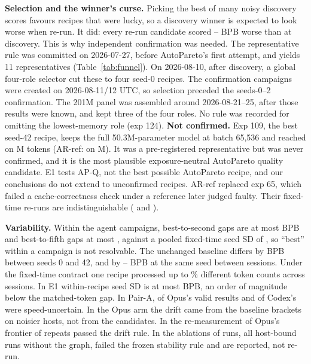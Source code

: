 \documentclass{article}
\newif\ifshowhumanmarkers \showhumanmarkersfalse
\newcommand{\humantag}[1]{{\color{humanframe}\sffamily\scriptsize\bfseries HUMAN AUTHOR MUST REWRITE/VERIFY [#1]}\ }
\newcommand{\humanauthor}[2][]{\ifshowhumanmarkers\begin{humanbox}\humantag{#1}#2\end{humanbox}\else #2\par\fi}
\begin{document}
\humanauthor[P2-09]{\textbf{Selection and the winner's curse.} Picking the best of many noisy discovery scores favours recipes that were lucky, so a discovery winner is expected to look worse when re-run. It did: every re-run candidate scored \CROptMin--\CROptMax{} BPB worse than at discovery. This is why independent confirmation was needed. The representative rule was committed on 2026-07-27, before AutoPareto's first attempt, and yields 11 representatives (Table~\ref{tab:funnel}). On 2026-08-10, after discovery, a global four-role selector cut these to four seed-0 recipes. The confirmation campaigns were created on 2026-08-11/12 UTC, so selection preceded the seeds-0--2 confirmation. The 201M panel was assembled around 2026-08-21--25, after those results were known, and kept three of the four roles. No rule was recorded for omitting the lowest-memory role (exp 124). \textbf{Not confirmed.} Exp 109, the best seed-42 recipe, keeps the full 50.3M-parameter model at batch 65,536 and reached \CRExpOneZeroNineBPB{} on \CRExpOneZeroNineTokens M tokens (AR-ref: \CRSeedFortyTwoAR{} on \CRExpSixEightTokens M). It was a pre-registered representative but was never confirmed, and it is the most plausible exposure-neutral AutoPareto quality candidate. E1 tests AP-Q, not the best possible AutoPareto recipe, and our conclusions do not extend to unconfirmed recipes. AR-ref replaced exp 65, which failed a cache-correctness check under a reference later judged faulty. Their fixed-time re-runs are indistinguishable (\CRFixedSixtyFive{} and \CRFixedSixtyEight).}

\humanauthor[P2-10]{\textbf{Variability.} Within the agent campaigns, best-to-second gaps are at most \CRGapTwoMax{} BPB and best-to-fifth gaps at most \CRGapFiveMax, against a pooled fixed-time seed SD of \CRPooledSD, so ``best'' within a campaign is not resolvable. The unchanged baseline differs by \CRBaseSeedEffect{} BPB between seeds 0 and 42, and by \CRSessionLo--\CRSessionHi{} BPB at the same seed between sessions. Under the fixed-time contract one recipe processed up to \CRTokenSpreadMax\% different token counts across sessions. In E1 within-recipe seed SD is at most \CREOneMaxSD{} BPB, an order of magnitude below the matched-token gap. In Pair-A, \CROpUncertain{} of Opus's \CROpValid{} valid results and \CRCxUncertain{} of Codex's \CRCxValid{} were speed-uncertain. In the Opus arm the drift came from the baseline brackets on noisier hosts, not from the candidates. In the re-measurement of Opus's frontier \CROpStableRepeats{} of \CROpRepeats{} repeats passed the drift rule. In the ablations \CRIAUnstable{} of \CRIARuns{} runs, all host-bound runs without the graph, failed the frozen stability rule and are reported, not re-run.}
\end{document}
